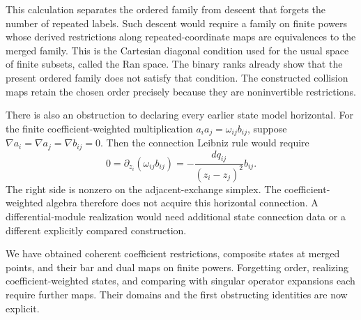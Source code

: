 This calculation separates the ordered family from descent that
forgets the number of repeated labels.
Such descent would require a family on finite powers whose
derived restrictions along repeated-coordinate maps are
equivalences to the merged family.
This is the Cartesian diagonal condition used for the usual
space of finite subsets, called the Ran space.
The binary ranks already show that the present ordered family
does not satisfy that condition.
The constructed collision maps retain the chosen order precisely
because they are noninvertible restrictions.

There is also an obstruction to declaring every earlier state
model horizontal.
For the finite coefficient-weighted multiplication
$a_i a_j=\omega_{ij}b_{ij}$, suppose
$\nabla a_i=\nabla a_j=\nabla b_{ij}=0$.
Then the connection Leibniz rule would require
\[
 0=\partial_{z_i}(\omega_{ij}b_{ij})
   =-\frac{dq_{ij}}{(z_i-z_j)^2}b_{ij}.
\]
The right side is nonzero on the adjacent-exchange simplex.
The coefficient-weighted algebra therefore does not acquire
this horizontal connection.
A differential-module realization would need additional state
connection data or a different explicitly compared construction.

We have obtained coherent coefficient restrictions, composite
states at merged points, and their bar and dual maps on finite
powers. Forgetting order, realizing coefficient-weighted states,
and comparing with singular operator expansions each require
further maps. Their domains and the first obstructing identities
are now explicit.
